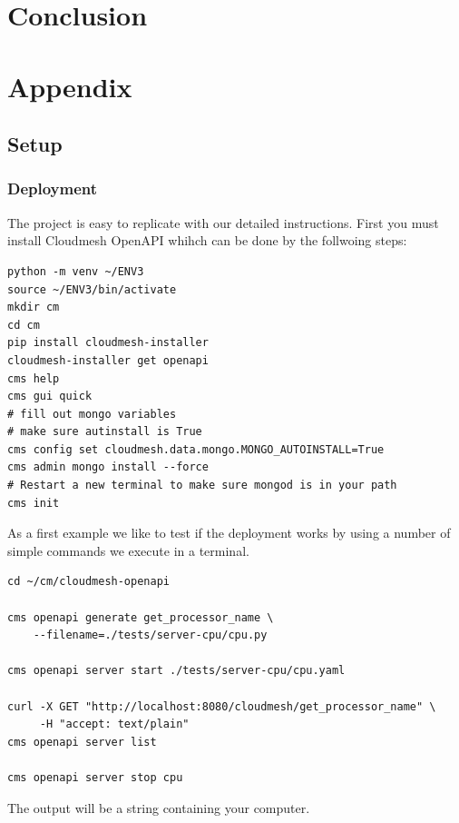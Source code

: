 \section{Conclusion}\label{conclusion}


\appendix

\section{Appendix}

\subsection{Setup}\label{appendix-a.---setup}

\subsubsection{Deployment}\label{a.1.-deployment}

The project is easy to replicate with our detailed instructions. First
you must install Cloudmesh OpenAPI whihch can be done by the follwoing
steps:

\begin{verbatim}
python -m venv ~/ENV3
source ~/ENV3/bin/activate 
mkdir cm
cd cm
pip install cloudmesh-installer
cloudmesh-installer get openapi 
cms help
cms gui quick
# fill out mongo variables
# make sure autinstall is True
cms config set cloudmesh.data.mongo.MONGO_AUTOINSTALL=True
cms admin mongo install --force
# Restart a new terminal to make sure mongod is in your path
cms init
\end{verbatim}

As a first example we like to test if the deployment works by using a
number of simple commands we execute in a terminal.

\begin{verbatim}
cd ~/cm/cloudmesh-openapi

cms openapi generate get_processor_name \
    --filename=./tests/server-cpu/cpu.py

cms openapi server start ./tests/server-cpu/cpu.yaml

curl -X GET "http://localhost:8080/cloudmesh/get_processor_name" \
     -H "accept: text/plain"
cms openapi server list

cms openapi server stop cpu
\end{verbatim}

The output will be a string containing your computer.

